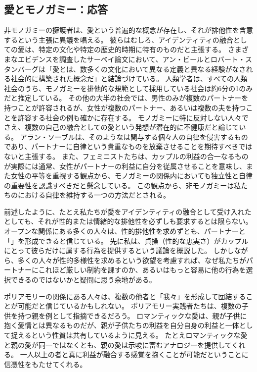 \documentclass[paper=a4,book,openany]{jlreq} \usepackage{mystyle}
\begin{document}
\subsection{愛とモノガミー：応答}

非モノガミーの擁護者は、愛という普遍的な概念が存在し、それが排他性を含意するという主張に異議を唱える。
彼らはむしろ、アイデンティティの融合としての愛は、特定の文化や特定の歴史的時期に特有のものだと主張する。
さまざまなエビデンスを調査したサーベイ論文において、アン・ビールとロバート・スタンバーグは「愛とは、数多くの文化において異なる定義と異なる経験がなされる社会的に構築された概念だ」と結論づけている\citep[p.433]{beall95:_social_const_love}。
人類学者は、すべての人類社会のうち、モノガミーを排他的な規範として採用している社会は約6分の1のみだと推定している。
その他の大半の社会では、男性のみが複数のパートナーを持つことが許容されるが、女性が複数のパートナー、あるいは複数の夫を持つことを許容する社会の例も確かに存在する。
モノガミーに特に反対しない人々でさえ、複数の自己の融合としての愛という発想が潜在的に不健康だと論じている。
アラン・ソーブルは、そのようなは関与する個々人の自律を侵害するものであり、パートナーに自律という貴重なものを放棄させることを期待すべきではないと主張する\citep{soble97:_union_auton_concer}。
また、フェミニストたちは、カップルの利益の合一なるものが実際には通常、女性がパートナーの利益に自分を従属させることを意味し、また女性の平等を重視する観点から、モノガミーの関係内においても独立性と自律の重要性を認識すべきだと懸念している\citep{friedman98:_roman_love_person_auton}。
この観点から、非モノガミーは私たちのにおける自律を維持する一つの方法だとされる。

前述したように、たとえ私たちが愛をアイデンティティの融合として受け入れたとしても、それが性的または情緒的な排他性を必ずしも要求するとは限らない。
オープンな関係にある多くの人々は、性的排他性を求めずとも、パートナーと「」を形成できると信じている。
先に私は、貞操（性的な忠実さ）がカップルにとって彼らだけに属する行為を提供するという議論を概説した。
しかしながら、多くの人々が性的多様性を求めるという欲望を考慮すれば、なぜ私たちがパートナーにこれほど厳しい制約を課すのか、あるいはもっと容易に他の行為を選択できるのではないかと疑問に思う余地がある。

ポリアモリーの関係にある人々は、複数の他者と「我々」を形成して団結することが可能だと信じているかもしれない。
ポリアモリー実践者たちは、複数の子供を持つ親を例として指摘できるだろう。
ロマンティックな愛は、親が子供に抱く愛情とは異なるものだが、親が子供たちの利益を自分自身の利益と一体として捉えるという性質は共有しているように見える。
たとえロマンティックな愛と親の愛が同一ではなくとも、親の愛は示唆に富むアナロジーを提供してくれる。
一人以上の者と真に利益が融合する感覚を抱くことが可能だということに信憑性をもたせてくれる。
\end{document}
